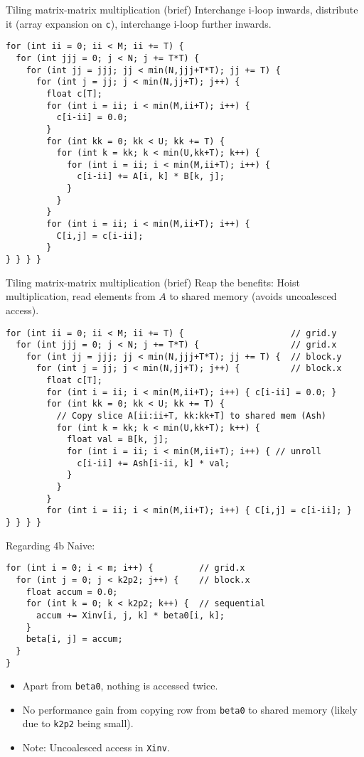 \begin{frame}[fragile]{Tiling matrix-matrix multiplication (brief)}
  Interchange i-loop inwards, distribute it (array expansion on \texttt{c}),
  interchange i-loop further inwards.
\begin{verbatim}
for (int ii = 0; ii < M; ii += T) {
  for (int jjj = 0; j < N; j += T*T) {
    for (int jj = jjj; jj < min(N,jjj+T*T); jj += T) {
      for (int j = jj; j < min(N,jj+T); j++) {
        float c[T];
        for (int i = ii; i < min(M,ii+T); i++) {
          c[i-ii] = 0.0;
        }
        for (int kk = 0; kk < U; kk += T) {
          for (int k = kk; k < min(U,kk+T); k++) {
            for (int i = ii; i < min(M,ii+T); i++) {
              c[i-ii] += A[i, k] * B[k, j];
            }
          }
        }
        for (int i = ii; i < min(M,ii+T); i++) {
          C[i,j] = c[i-ii];
        }
} } } }
\end{verbatim}
\end{frame}

\begin{frame}[fragile]{Tiling matrix-matrix multiplication (brief)}
  Reap the benefits: Hoist multiplication, read elements from \(A\) to shared
  memory (avoids uncoalesced access).
\begin{verbatim}
for (int ii = 0; ii < M; ii += T) {                     // grid.y
  for (int jjj = 0; j < N; j += T*T) {                  // grid.x
    for (int jj = jjj; jj < min(N,jjj+T*T); jj += T) {  // block.y
      for (int j = jj; j < min(N,jj+T); j++) {          // block.x
        float c[T];
        for (int i = ii; i < min(M,ii+T); i++) { c[i-ii] = 0.0; }
        for (int kk = 0; kk < U; kk += T) {
          // Copy slice A[ii:ii+T, kk:kk+T] to shared mem (Ash)
          for (int k = kk; k < min(U,kk+T); k++) {
            float val = B[k, j];
            for (int i = ii; i < min(M,ii+T); i++) { // unroll
              c[i-ii] += Ash[i-ii, k] * val;
            }
          }
        }
        for (int i = ii; i < min(M,ii+T); i++) { C[i,j] = c[i-ii]; }
} } } }
\end{verbatim}
\end{frame}

\begin{frame}[fragile]{Regarding 4b}
  Naive:
\begin{verbatim}
for (int i = 0; i < m; i++) {         // grid.x
  for (int j = 0; j < k2p2; j++) {    // block.x
    float accum = 0.0;
    for (int k = 0; k < k2p2; k++) {  // sequential
      accum += Xinv[i, j, k] * beta0[i, k];
    }
    beta[i, j] = accum;
  }
}
\end{verbatim}
\begin{itemize}
  \item
    Apart from \texttt{beta0}, nothing is accessed twice.
  \item
    No performance gain from copying row from \texttt{beta0} to shared memory
    (likely due to \texttt{k2p2} being small).
  \item
    Note: Uncoalesced access in \texttt{Xinv}.
\end{itemize}
\end{frame}

